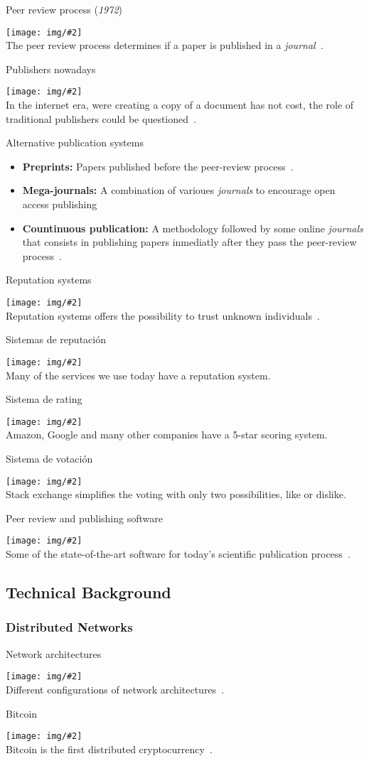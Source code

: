 \documentclass{beamer}
\newcommand{\ib}[1]{\item \textbf{#1} }
\newcommand{\frameitc}[4]{
  \begin{frame}{#1}
    \begin{center}
      \texttt{[image: img/\#2]}\\
      #3~\cite{#4}.
    \end{center}
  \end{frame}
}
\newcommand{\frameitcp}[5]{
  \begin{frame}{#1}
    \begin{center}
      \texttt{[image: img/\#2]}\\
      #3~\cite{#4}.
    \end{center}
  \end{frame}
}
\newcommand{\frameit}[3]{
  \begin{frame}{#1}
    \begin{center}
      \texttt{[image: img/\#2]}\\
      #3.
    \end{center}
  \end{frame}
}
\newcommand{\framet}[2]{
  \begin{frame}{#1}
    #2
  \end{frame}
}
\begin{document}
\frameitc{Peer review process (\emph{1972})}{peerreview.png}{The peer review process determines if a paper is published in a \emph{journal}}{spier2002history}

\frameitc{Publishers nowadays}{publishers2.png}{In the internet era, were creating a copy of a document has not cost, the role of traditional publishers could be questioned}{lariviere2015oligopoly}

\framet{Alternative publication systems}{
  \begin{itemize}
    \ib{Preprints:} Papers published before the peer-review process~\cite{shuai2012scientific}.
    \ib{Mega-journals:} A combination of varioues \emph{journals} to encourage open access publishing~\cite{binfield2013open}
    \ib{Countinuous publication:} A methodology followed by some online \emph{journals} that consists in publishing papers inmediatly after they pass the peer-review process~\cite{anderton2013continuous}.
  \end{itemize}
}

\frameitc{Reputation systems}{reputation.png}{Reputation systems offers the possibility to trust unknown individuals}{resnick2000reputation}

\frameit{Sistemas de reputación}{reputation2.png}{Many of the services we use today have a reputation system}

\frameit{Sistema de rating}{amazon.jpg}{Amazon, Google and many other companies have a 5-star scoring system}
  
\frameit{Sistema de votación}{se.png}{Stack exchange simplifies the voting with only two possibilities, like or dislike}
  
\frameitc{Peer review and publishing software}{ems.png}{Some of the state-of-the-art software for today's scientific publication process}{azar2006academic,paulo2011aems,Lev2016,rajpert2016rewarding,willinsky2005open}

\subsection{Technical Background}
\subsubsection{Distributed Networks}
\frameitc{Network architectures}{architectures.png}{Different configurations of network architectures}{baran1964distributed}

\frameitcp{Bitcoin}{btci.png}{Bitcoin is the first distributed cryptocurrency}{nakamoto2008bitcoin}{0.7}
\end{document}
